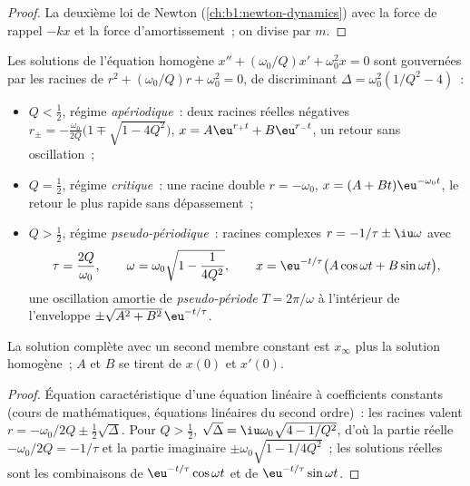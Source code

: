 \begin{proof}
La deuxième loi de Newton (\cref{ch:b1:newton-dynamics}) avec la force
de rappel $-kx$ et la force d'amortissement~; on divise par $m$.
\end{proof}

\begin{theorem}\label{thm:b1:transient-regimes:regimes}
Les solutions de l'équation homogène $x'' + (\omega_0/Q)x' +
\omega_0^2 x = 0$ sont gouvernées par les racines de $r^2 + (\omega_0/Q)r +
\omega_0^2 = 0$, de discriminant $\Delta = \omega_0^2(1/Q^2 - 4)$~:
\begin{itemize}
  \item $Q < \tfrac12$, régime \emph{apériodique}~: deux racines réelles
        négatives $r_\pm = -\frac{\omega_0}{2Q}\big(1 \mp \sqrt{1 - 4Q^2}\big)$,
        $x = A\eu^{r_+t} + B\eu^{r_-t}$, un retour sans oscillation~;
  \item $Q = \tfrac12$, régime \emph{critique}~: une racine double
        $r = -\omega_0$, $x = (A + Bt)\eu^{-\omega_0 t}$, le retour le
        plus rapide sans dépassement~;
  \item $Q > \tfrac12$, régime \emph{pseudo-périodique}~: racines
        complexes $r = -1/\tau \pm \iu\omega$ avec
        \[
        \tau = \frac{2Q}{\omega_0}, \qquad
        \omega = \omega_0\sqrt{1 - \frac{1}{4Q^2}},
        \qquad
        x = \eu^{-t/\tau}\big(A\cos\omega t + B\sin\omega t\big),
        \]
        une oscillation amortie de \emph{pseudo-période} $T = 2\pi/\omega$
        à l'intérieur de l'enveloppe $\pm\sqrt{A^2 + B^2}\,\eu^{-t/\tau}$.
\end{itemize}
La solution complète avec un second membre constant est $x_\infty$ plus
la solution homogène~; $A$ et $B$ se tirent de $x(0)$ et $x'(0)$.
\end{theorem}

\begin{proof}
Équation caractéristique d'une équation linéaire à coefficients
constants (cours de mathématiques, équations linéaires du second
ordre)~: les racines valent $r = -\omega_0/2Q \pm \tfrac12\sqrt\Delta$. Pour $Q > \tfrac12$,
$\sqrt\Delta = \iu\omega_0\sqrt{4 - 1/Q^2}$, d'où la partie réelle
$-\omega_0/2Q = -1/\tau$ et la partie imaginaire $\pm\omega_0\sqrt{1 - 1/4Q^2}$~;
les solutions réelles sont les combinaisons de $\eu^{-t/\tau}\cos\omega t$
et de $\eu^{-t/\tau}\sin\omega t$.
\end{proof}

